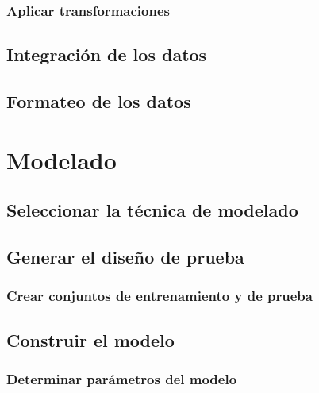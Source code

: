 \documentclass[11pt,a4paper,twoside]{tesis}
\begin{document}
\subsection{Aplicar transformaciones}

\section{Integración de los datos}

\section{Formateo de los datos}


\chapter{Modelado}
\section{Seleccionar la técnica de modelado}
\section{Generar el diseño de prueba}
\subsection{Crear conjuntos de entrenamiento y de prueba}
\section{Construir el modelo}
\subsection{Determinar parámetros del modelo}
\end{document}
